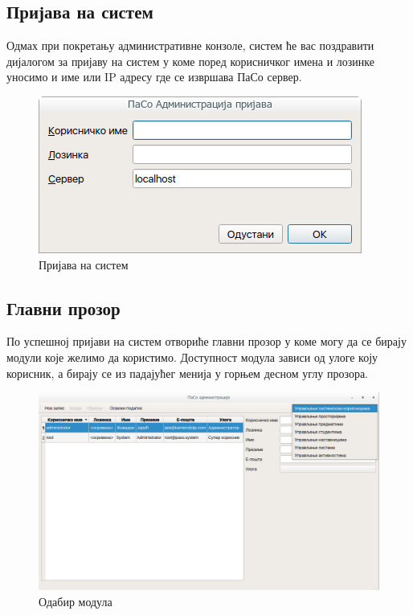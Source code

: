\documentclass[a4paper, 12pt, diplomski]{etfcyr}
\begin{document}
			\subsection{Пријава на систем}
				\begin{justify}
					Одмах при покретању административне конзоле, систем ће вас поздравити дијалогом за пријаву на систем у коме поред корисничког имена и лозинке уносимо и име или IP адресу где се извршава ПаСо сервер.
					\begin{figure}[h]
						\begin{center}
							\includegraphics[scale=.5]{manual/login.png}
						\end{center}
						\caption{Пријава на систем}
						\label{figure:login_dialog}
					\end{figure}
				\end{justify}

			\newpage

			\subsection{Главни прозор}
				\begin{justify}
					По успешној пријави на систем отвориће главни прозор у коме могу да се бирају модули које желимо да користимо. Доступност модула зависи од улоге коју корисник, а бирају се из падајућег менија у горњем десном углу прозора.
					\begin{figure}[h]
						\begin{center}
							\includegraphics[width=1.0\textwidth]{manual/module_picker.png}
						\end{center}
						\caption{Одабир модула}
						\label{figure:module_picker}
					\end{figure}
				\end{justify}
\end{document}
